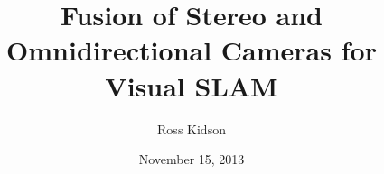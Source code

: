 \newcommand{\thedoctype}{Master's Thesis in Informatik\xspace}
\newcommand{\thetitle}{Fusion of Stereo and Omnidirectional Cameras for Visual SLAM\xspace}
\newcommand{\thetitleGer}{Visueller SLAM mittels Datenfusion aus Stereo- und omnidirektionalen Kameras\xspace}
\newcommand{\theauthor}{Ross Kidson\xspace}
\newcommand{\theplace}{Palo Alto\xspace}
\newcommand{\thedate}{November 15, 2013\xspace}
\newcommand{\thesupervisor}{Prof. Juergen Sturm, Ph.D.}
\newcommand{\theadvisor}{Matthias Roland}

\date{\thedate}
\title{\thetitle}
\author{\theauthor}

\newcommand{\footertext}{}
